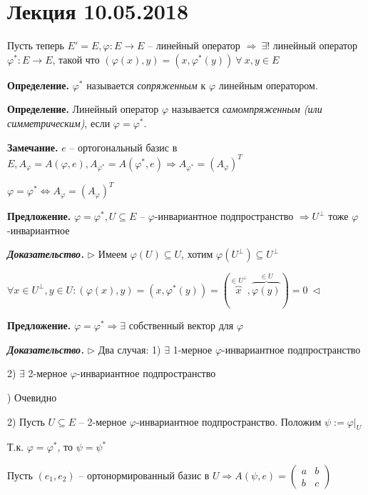 \section{Лекция 10.05.2018}

Пусть теперь $E' = E, \varphi: E \rightarrow E$ -- линейный оператор $\Rightarrow \ \exists!$ линейный оператор $\varphi^*: E \rightarrow E$, такой что $(\varphi(x), y) = (x, \varphi^*(y)) \ \forall \ x, y \in E$

\bigskip
\textbf{Определение.} $\varphi^*$ называется \textit{сопряженным} к $\varphi$ линейным оператором.

\bigskip
\textbf{Определение.} Линейный оператор $\varphi$ называется \textit{самомпряженным (или симметрическим)}, если $\varphi = \varphi^*$.

\bigskip
\textbf{Замечание.} $e$ -- ортогональный базис в $E, A_{\varphi} = A(\varphi, e), A_{\varphi^*} = A(\varphi^*, e) \Rightarrow A_{\varphi^*} = (A_{\varphi})^T$

$\varphi = \varphi^* \Leftrightarrow A_{\varphi} = (A_{\varphi})^T$

\bigskip
\textbf{Предложение.} $\varphi = \varphi^*, U \subseteq E$ -- $\varphi$-инвариантное подпространство $\Rightarrow U^{\bot}$ тоже $\varphi$-инвариантное

\bigskip
\textbf{\textit{Доказательство.}} $\rhd$ Имеем $\varphi(U) \subseteq U$, хотим $\varphi(U^{\bot}) \subseteq U^{\bot}$

$\forall x \in U^{\bot}, y \in U: (\varphi(x), y) = (x, \varphi^* (y)) = (\overbrace{x}^{\in U^{\bot}}, \overbrace{\varphi(y)}^{\in U}) = 0 \ \lhd$

\bigskip
\textbf{Предложение.} $\varphi = \varphi^* \Rightarrow \exists$ собственный вектор для $\varphi$

\bigskip
\textbf{\textit{Доказательство.}} $\rhd$ Два случая: 1) $\exists$ 1-мерное $\varphi$-инвариантное подпространство

2) $\exists$ 2-мерное $\varphi$-инвариантное подпространство

) Очевидно

2) Пусть $U \subseteq E$ -- 2-мерное $\varphi$-инвариантное подпространство. Положим $\psi := \varphi|_U$

Т.к. $\varphi = \varphi^*$, то $\psi = \psi^*$

Пусть $(e_1, e_2)$ -- ортонормированный базис в $U \Rightarrow A(\psi, e) = \begin{pmatrix} a & b \\ b & c \end{pmatrix}$

